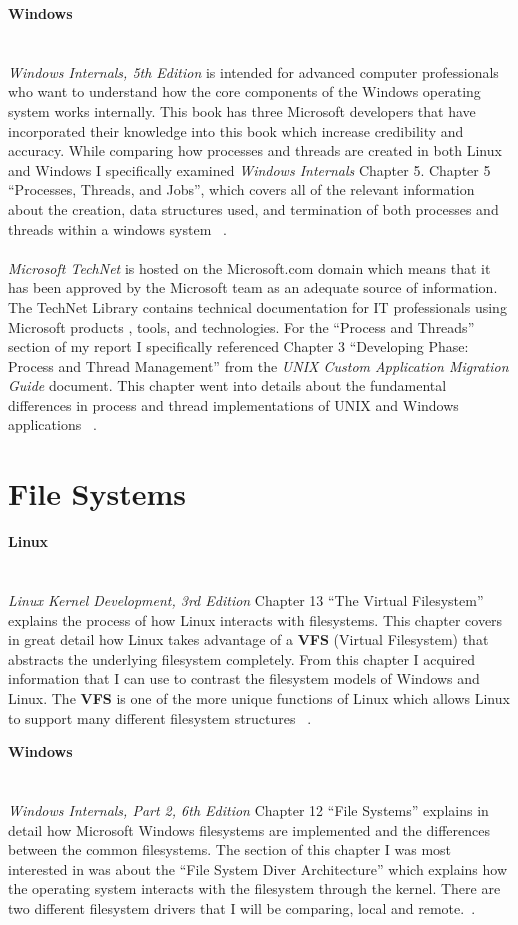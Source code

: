 \documentclass[letterpaper,10pt,notitlepage,fleqn]{article}
\begin{document}
\textbf{Windows} \\ \\ \\
\textit{Windows Internals, 5th Edition} is intended for advanced computer professionals 
who want to understand how the core components of the Windows operating system 
works internally. This book has three Microsoft developers that have incorporated 
their knowledge into this book which increase credibility and accuracy. While 
comparing how processes and threads are created in both Linux and Windows I specifically 
examined \textit{Windows Internals} Chapter 5. 
Chapter 5 ``Processes, Threads, and Jobs'', which covers all of the relevant information 
about the creation, data structures used, and termination of both processes and 
threads within a windows system ~\cite{WI5}. 
\\ \\
\textit{Microsoft TechNet} is hosted on the Microsoft.com domain which means that 
it has been approved by the Microsoft team as an adequate source of information. The 
TechNet Library contains technical documentation for IT professionals using Microsoft 
products , tools, and technologies. For the ``Process and Threads'' section of my 
report I specifically referenced Chapter 3 ``Developing Phase: Process and Thread 
Management'' from the \textit{UNIX Custom Application Migration Guide} document. 
This chapter went into details about the fundamental differences in process and 
thread implementations of UNIX and Windows applications ~\cite{TN}. 

\section{File Systems}
\textbf{Linux} \\ \\ \\
\textit{Linux Kernel Development, 3rd Edition} Chapter 13 ``The Virtual Filesystem''
explains the process of how Linux interacts with filesystems. This chapter covers 
in great detail how Linux takes advantage of a \textbf{VFS} (Virtual Filesystem) 
that abstracts the underlying filesystem completely. From this chapter I acquired 
information that I can use to contrast the filesystem models of Windows and Linux. 
The \textbf{VFS} is one of the more unique functions of Linux which allows Linux 
to support many different filesystem structures 
~\cite{LKD3}. 


\textbf{Windows} \\ \\ \\
\textit{Windows Internals, Part 2, 6th Edition} Chapter 12 ``File Systems'' explains 
in detail how Microsoft Windows filesystems are implemented and the differences 
between the common filesystems. The section of this chapter I was most interested 
in was about the ``File System Diver Architecture'' which explains how the operating 
system interacts with the filesystem through the kernel. There are two different 
filesystem drivers that I will be comparing, local and remote.~\cite{WI26}.
\end{document}
